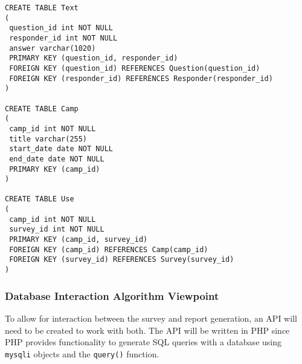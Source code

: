 \documentclass[letterpaper,10pt,serif, draftclsnofoot,onecolumn, compsoc, titlepage]{IEEEtran}
\begin{document}
\begin{lstlisting}
CREATE TABLE Text
(
 question_id int NOT NULL
 responder_id int NOT NULL
 answer varchar(1020)
 PRIMARY KEY (question_id, responder_id)
 FOREIGN KEY (question_id) REFERENCES Question(question_id)
 FOREIGN KEY (responder_id) REFERENCES Responder(responder_id)
)

CREATE TABLE Camp
(
 camp_id int NOT NULL
 title varchar(255)
 start_date date NOT NULL
 end_date date NOT NULL
 PRIMARY KEY (camp_id)
)

CREATE TABLE Use
(
 camp_id int NOT NULL
 survey_id int NOT NULL
 PRIMARY KEY (camp_id, survey_id)
 FOREIGN KEY (camp_id) REFERENCES Camp(camp_id)
 FOREIGN KEY (survey_id) REFERENCES Survey(survey_id)
)
\end{lstlisting}

\subsubsection{Database Interaction Algorithm Viewpoint}
To allow for interaction between the survey and report generation, an API will need to be created to work with both.
The API will be written in PHP since PHP provides functionality to generate SQL queries with a database using \texttt{mysqli} objects and the \texttt{query()} function.
\end{document}
